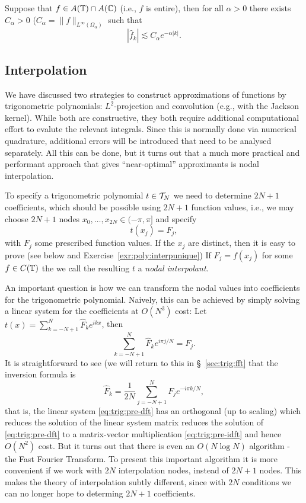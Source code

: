 \begin{corollary} \label{th:trig:pw-entire}
  Suppose that $f \in A(\mathbb{T}) \cap A(\mathbb{C})$  (i.e., $f$ is entire), then for all
  $\alpha > 0$ there exists $C_\alpha > 0$ ($C_\alpha =
  \|f\|_{L^\infty(\Omega_\alpha)}$ such that
  \[
      |\hat{f}_k| \lesssim C_\alpha e^{-\alpha |k|}.
  \]
\end{corollary}



\subsection{Interpolation}
%
\label{sec:trig:interp}
%
We have discussed two strategies to construct approximations of functions by
trigonometric polynomials: $L^2$-projection and convolution (e.g., with the
Jackson kernel). While both are constructive, they both require additional 
computational effort to evalute the relevant integrals. Since this is normally 
done via numerical quadrature, additional errors will be introduced that 
need to be analysed separately. All this can be done, but it turns out that 
a much more practical and performant approach that gives ``near-optimal''
approximants is nodal interpolation.

To specify a trigonometric polynomial $t \in \mathcal{T}_N$ we need to determine
$2N+1$ coefficients, which should be possible using $2N+1$ function values,
i.e., we may choose $2N+1$ nodes $x_0, \dots, x_{2N} \in (-\pi, \pi]$
and specify 
\[
    t(x_j) = F_j,  
\]
with $F_j$ some prescribed function values. If the $x_j$ are distinct, then it
is easy to prove (see below and Exercise~\ref{exr:poly:interpunique}) If $F_j =
f(x_j)$ for some $f \in C(\mathbb{T})$ the we call the resulting $t$ a {\em nodal
interpolant}. 

An important question is how we can transform the nodal values into coefficients
for the trigonometric polynomial. Naively, this can be achieved by simply
solving a linear system for the coefficients at $O(N^3)$ cost: 
Let $t(x) = \sum_{k = -N+1}^N \hat{F}_k e^{ik x}$, then
\begin{equation} \label{eq:trig:pre-dft}
  \sum_{k = -N+1}^N \hat{F}_k e^{i\pi j/N} = F_j.
\end{equation}
It is straightforward to see (we will return to this in \S~\ref{sec:trig:fft}
that the inversion formula is 
\begin{equation} \label{eq:trig:pre-idft}
    \hat{F}_k = \frac{1}{2N} \sum_{j = -N+1}^N F_j e^{-i\pi k/N},
\end{equation}
that is, the linear system \eqref{eq:trig:pre-dft}  has an orthogonal (up to
scaling) which reduces the solution of the linear system matrix reduces the
solution of \eqref{eq:trig:pre-dft} to a matrix-vector multiplication
\eqref{eq:trig:pre-idft} and hence $O(N^2)$ cost. But it turns out that there is
even an $O(N \log N)$ algorithm - the Fast Fourier Transform. To present this
important algorithm it is more convenient if we work with $2N$ interpolation
nodes, instead of $2N+1$ nodes. This makes the theory of interpolation subtly
different, since with $2N$ conditions we can no longer hope to determing $2N+1$
coefficients. 

